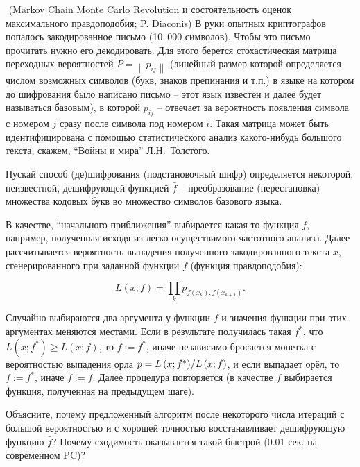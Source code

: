 \begin{problem}\Star\,\,\Star (Markov Chain Monte Carlo Revolution и состоятельность
оценок максимального правдоподобия; P. Diaconis)
\label{cript}
В руки опытных криптографов попалось закодированное письмо (10~000 символов). Чтобы это 
письмо прочитать нужно его декодировать. Для этого берется стохастическая 
матрица переходных вероятностей $P=\left\| {p_{ij} } \right\|$ (линейный 
размер которой определяется числом возможных символов (букв, знаков 
препинания и т.п.) в языке на котором до шифрования было написано письмо -- 
этот язык известен и далее будет называться базовым), в которой $p_{ij} $ -- 
отвечает за вероятность появления символа с номером $j$ сразу после символа 
под номером $i$. Такая матрица может быть идентифицирована с помощью 
статистического анализ какого-нибудь большого текста, скажем, ``Войны и 
мира'' Л.Н.~Толстого.

Пускай способ (де)шифрования (подстановочный шифр) определяется некоторой, 
неизвестной, дешифрующей функцией $\bar {f}$ -- преобразование 
(перестановка) множества кодовых букв во множество символов базового языка.

В качестве, ``начального приближения'' выбирается какая-то функция $f$, 
например, полученная исходя из легко осуществимого частотного анализа. Далее 
рассчитывается вероятность выпадения полученного закодированного текста 
$ {x}$, сгенерированного при заданной функции $f$ (функция 
правдоподобия):

\[%
L\left( {{x};f} \right)=\prod\limits_k {p_{f\left( {x_k } 
\right),f\left( {x_{k+1} } \right)} } . 
\]

Случайно выбираются два аргумента у функции $f$ и значения функции при этих 
аргументах меняются местами. Если в результате получилась такая $f^\ast $, 
что $L\left( { {x};f^\ast } \right)\ge L\left( { {x};f} \right)$, то 
$f:=f^\ast $, иначе независимо бросается монетка с вероятностью выпадения 
орла $p={L\left( { {x};f^\ast } \right)} \mathord{\left/ {\vphantom 
{{L\left( {\vec {x};f^\ast } \right)} {L\left( { {x};f} \right)}}} 
\right. \kern-\nulldelimiterspace} {L\left( { {x};f} \right)}$, и если 
выпадает орёл, то $f:=f^\ast $, иначе $f:=f$. Далее процедура повторяется (в 
качестве $f$ выбирается функция, полученная на предыдущем шаге).

Объясните, почему предложенный алгоритм после некоторого числа итераций с 
большой вероятностью и с хорошей точностью восстанавливает дешифрующую 
функцию $\bar {f}$? Почему сходимость оказывается такой быстрой (0.01 сек. на современном PC)?

\end{problem}

